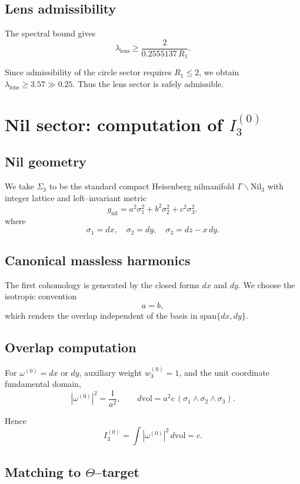 \documentclass[11pt]{article}
\begin{document}
\subsection{Lens admissibility}

The spectral bound gives
\[
\lambda_{\mathrm{lens}} \ge \frac{2}{0.2555137\,R_1}.
\]

Since admissibility of the circle sector requires $R_1\le 2$,
we obtain $\lambda_{\mathrm{lens}}\ge 3.57 \gg 0.25$.
Thus the lens sector is safely admissible.

\section{Nil sector: computation of $I_3^{(0)}$}

\subsection{Nil geometry}

We take $\Sigma_3$ to be the standard compact Heisenberg nilmanifold
$\Gamma\backslash\mathrm{Nil}_3$ with integer lattice and
left--invariant metric
\[
g_{\mathrm{nil}} = a^2\sigma_1^2 + b^2\sigma_2^2 + c^2\sigma_3^2,
\]
where
\[
\sigma_1=dx,\quad \sigma_2=dy,\quad \sigma_3=dz-x\,dy.
\]

\subsection{Canonical massless harmonics}

The first cohomology is generated by the closed forms $dx$ and $dy$.
We choose the isotropic convention
\[
a=b,
\]
which renders the overlap independent of the basis in
$\mathrm{span}\{dx,dy\}$.

\subsection{Overlap computation}

For $\omega^{(0)}=dx$ or $dy$, auxiliary weight $w_3^{(0)}=1$, and the unit
coordinate fundamental domain,
\[
|\omega^{(0)}|^2 = \frac{1}{a^2},
\qquad
d\mathrm{vol} = a^2 c\,(\sigma_1\wedge\sigma_2\wedge\sigma_3).
\]

Hence
\[
I_3^{(0)} = \int |\omega^{(0)}|^2\,d\mathrm{vol} = c.
\]

\subsection{Matching to $\Theta$--target}
\end{document}
